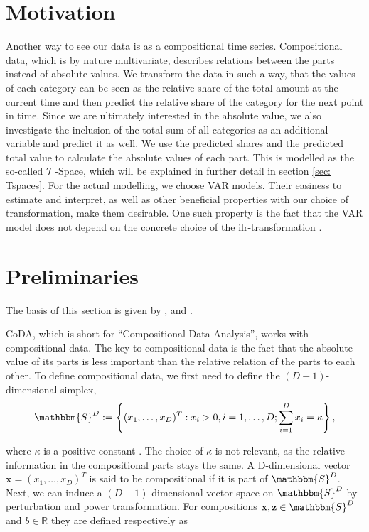 \section{Motivation}
\label{sec: Coda Motivation}

Another way to see our data is as a compositional time series. Compositional data, which is by nature multivariate, describes relations between the parts instead of absolute values. We transform the data in such a way, that the values of each category can be seen as the relative share of the total amount at the current time and then predict the relative share of the category for the next point in time. Since we are ultimately interested in the absolute value, we also investigate the inclusion of the total sum of all categories as an additional variable and predict it as well. We use the predicted shares and the predicted total value to calculate the absolute values of each part. This is modelled as the so-called $\mathcal{T}$-Space, which will be explained in further detail in section \ref{sec: Tspaces}. For the actual modelling, we choose VAR models. Their easiness to estimate and interpret, as well as other beneficial properties with our choice of transformation, make them desirable. One such property is the fact that the VAR model does not depend on the concrete choice of the ilr-transformation \cite{Kynclova:2015}. 


\section{Preliminaries}
\label{sec: Coda Preliminaries}
The basis of this section is given by \cite{Kynclova:2015}, \cite{Egozcue:2003} and \cite{Filzmoser:2020}.

CoDA, which is short for "`Compositional Data Analysis"', works with compositional data. The key to compositional data is the fact that the absolute value of its parts is less important than the relative relation of the parts to each other. To define compositional data, we first need to define the $(D-1)$-dimensional simplex,
	\begin{equation}
	\mathbbm{S}^D := \left\{(x_1,\ldots, x_D)^T: x_i > 0, i =1,\ldots,D; \sum_{i=1}^{D}x_i=\kappa  \right\},
	\label{eq:Simplex Definition}
	\end{equation}
	
where $\kappa$ is a positive constant \cite{Kynclova:2015}. The choice of $\kappa$ is not relevant, as the relative information in the compositional parts stays the same.  A D-dimensional vector $\textbf{x} = (x_1,\ldots,x_D)^T$ is said to be compositional if it is part of $\mathbbm{S}^D$. Next, we can induce a $(D-1)$-dimensional vector space on $\mathbbm{S}^D$ by perturbation and power transformation. For compositions $\textbf{x},\textbf{z} \in \mathbbm{S}^D$ and $b \in \mathbb{R}$ they are defined respectively as \cite{Kynclova:2015}

